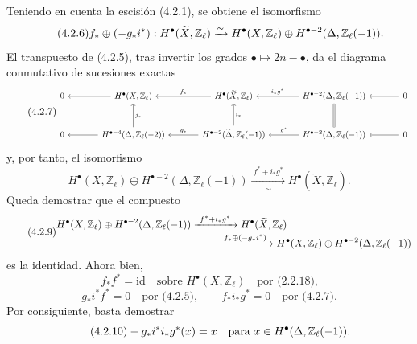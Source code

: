 Teniendo en cuenta la escisión (4.2.1), se obtiene el isomorfismo
\begin{equation}\tag{4.2.6}
f_*\oplus(-g_*i^*):
H^\bullet(\widetilde X,\mathbb Z_\ell)
\xrightarrow{\sim}
H^\bullet(X,\mathbb Z_\ell)\oplus
H^{\bullet-2}(\Delta,\mathbb Z_\ell(-1)).
\end{equation}
El transpuesto de (4.2.5), tras invertir los grados
$\bullet\mapsto2n-\bullet$, da el diagrama conmutativo de sucesiones
exactas
\begin{equation}\tag{4.2.7}
\resizebox{\textwidth}{!}{%
\begin{tikzcd}[ampersand replacement=\&,column sep=large,row sep=large]
0
  \&H^\bullet(X,\mathbb Z_\ell)\arrow[l]
  \&H^\bullet(\widetilde X,\mathbb Z_\ell)\arrow[l,"f_*"']
  \&H^{\bullet-2}(\Delta,\mathbb Z_\ell(-1))
       \arrow[l,"i_*g^*"']
  \&0\arrow[l]\\
0
  \&H^{\bullet-\sisi{2}{4}}(\Delta,\mathbb Z_\ell(-2))
       \arrow[l]\arrow[u,"j_*"']
  \&H^{\bullet-2}(\widetilde\Delta,\mathbb Z_\ell(-1))
       \arrow[l,"g_*"']\arrow[u,"i_*"']
  \&H^{\bullet-2}(\Delta,\mathbb Z_\ell(-1))
       \arrow[l,"\sisi{g_*}{g^*}"']\arrow[u,equal]
  \&0\arrow[l]
\end{tikzcd}}
\end{equation}
y, por tanto, el isomorfismo
\begin{equation}\tag{4.2.8}
H^\bullet(X,\mathbb Z_\ell)\oplus
H^{\bullet-2}(\Delta,\mathbb Z_\ell(-1))
\xrightarrow[\sim]{\ f^*+i_*g^*\ }
H^\bullet(\widetilde X,\mathbb Z_\ell).
\end{equation}
Queda demostrar que el compuesto
{\small\begin{equation}\tag{4.2.9}
\begin{aligned}
&H^\bullet(X,\mathbb Z_\ell)\oplus
 H^{\bullet-2}(\Delta,\mathbb Z_\ell(-1))
 \xrightarrow{\ f^*+i_*g^*\ }
 H^\bullet(\widetilde X,\mathbb Z_\ell)\\[-2pt]
&\hspace{55mm}\xrightarrow{\ f_*\oplus(\sisi{}{ -}g_*i^*)\ }
 H^\bullet(X,\mathbb Z_\ell)\oplus
 H^{\bullet-2}(\Delta,\mathbb Z_\ell(-1))
\end{aligned}
\end{equation}}
es la identidad. Ahora bien,
\[
f_*f^*=\mathrm{id}\quad\text{sobre }H^\bullet(X,\mathbb Z_\ell)
\quad\text{por (2.2.18),}
\]
\[
g_*i^*f^*=0\quad\text{por (4.2.5)},\qquad
f_*i_*g^*=0\quad\text{por (4.2.7)}.
\]
Por consiguiente, basta demostrar
\begin{equation}\tag{4.2.10}
-g_*i^*i_*g^*(x)=x
\quad\text{para }x\in H^\bullet(\Delta,\mathbb Z_\ell(-1)).
\end{equation}


